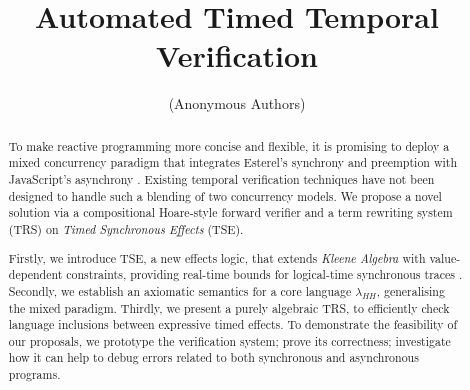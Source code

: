 \documentclass[acmsmall,review,anonymous]{acmart}\settopmatter{printfolios=true,printccs=false,printacmref=false}
\newcommand{\code}[1]{{\tt{\ensuremath{\m{#1}}}}}
\newcommand{\m}{\mathit}
\begin{document}
\title{Automated Timed Temporal Verification
}





\author{(Anonymous Authors)}






\begin{abstract} 
To make reactive programming more concise and flexible, it is promising to deploy a mixed concurrency paradigm \cite{berry2020hiphop} that
integrates Esterel's synchrony and preemption \cite{berry1999constructive}  
with JavaScript's asynchrony \cite{madsen2017model}. 
Existing temporal verification techniques have not been designed to handle such a blending of two concurrency
models.
We propose a novel solution via a 
compositional 
Hoare-style forward verifier and a term rewriting system (TRS) on \emph{Timed Synchronous Effects} (TSE).  

Firstly, we introduce TSE, a new effects logic, that extends \emph{Kleene Algebra} with value-dependent constraints, providing real-time bounds for logical-time synchronous traces \cite{von2017real}. 
Secondly, we establish an axiomatic semantics  for a core language \code{\lambda_{HH}}, generalising the mixed paradigm. 
Thirdly, we present a purely algebraic TRS, to efficiently check language inclusions between expressive timed effects.  
To demonstrate the feasibility of our proposals, we prototype the  verification system; prove its correctness; investigate how it can help to debug errors related to both synchronous and asynchronous programs. 


\end{abstract}
\end{document}

